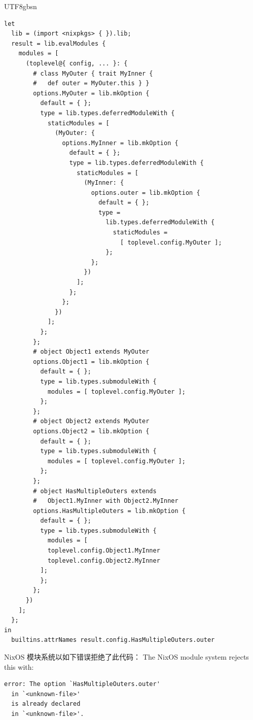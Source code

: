 \begin{CJK*}{UTF8}{gbsn}
\begin{listing}[htbp]
  \caption{}
  \label{lst:nixos-conflict}
\begin{verbatim}
let
  lib = (import <nixpkgs> { }).lib;
  result = lib.evalModules {
    modules = [
      (toplevel@{ config, ... }: {
        # class MyOuter { trait MyInner {
        #   def outer = MyOuter.this } }
        options.MyOuter = lib.mkOption {
          default = { };
          type = lib.types.deferredModuleWith {
            staticModules = [
              (MyOuter: {
                options.MyInner = lib.mkOption {
                  default = { };
                  type = lib.types.deferredModuleWith {
                    staticModules = [
                      (MyInner: {
                        options.outer = lib.mkOption {
                          default = { };
                          type =
                            lib.types.deferredModuleWith {
                              staticModules =
                                [ toplevel.config.MyOuter ];
                            };
                        };
                      })
                    ];
                  };
                };
              })
            ];
          };
        };
        # object Object1 extends MyOuter
        options.Object1 = lib.mkOption {
          default = { };
          type = lib.types.submoduleWith {
            modules = [ toplevel.config.MyOuter ];
          };
        };
        # object Object2 extends MyOuter
        options.Object2 = lib.mkOption {
          default = { };
          type = lib.types.submoduleWith {
            modules = [ toplevel.config.MyOuter ];
          };
        };
        # object HasMultipleOuters extends
        #   Object1.MyInner with Object2.MyInner
        options.HasMultipleOuters = lib.mkOption {
          default = { };
          type = lib.types.submoduleWith {
            modules = [
            toplevel.config.Object1.MyInner
            toplevel.config.Object2.MyInner
          ];
          };
        };
      })
    ];
  };
in
  builtins.attrNames result.config.HasMultipleOuters.outer
\end{verbatim}
\end{listing}

\noindent
\ifPaperChinese
NixOS 模块系统以如下错误拒绝了此代码：
\else
The NixOS module system rejects this with:
\fi

\begin{verbatim}
error: The option `HasMultipleOuters.outer'
  in `<unknown-file>'
  is already declared
  in `<unknown-file>'.
\end{verbatim}


\end{CJK*}
